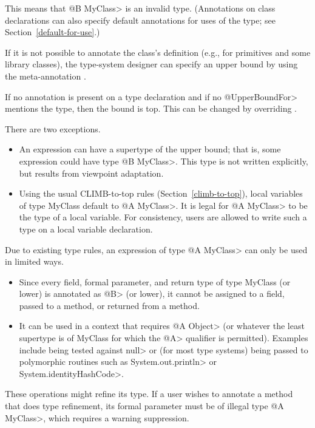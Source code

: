 This means that \<@B MyClass> is an invalid type.  (Annotations on class declarations can also specify
default annotations for uses of the type; see Section~\ref{default-for-use}.)

If it is not possible to annotate the class's definition (e.g., for
primitives and some library classes),
the type-system designer can specify an upper bound by using the meta-annotation
.

If no annotation is present on a type declaration and if no \<@UpperBoundFor> mentions the type, then
the bound is top. This can be changed by overriding
.

There are two exceptions.
\begin{itemize}
  \item
  An expression can have a supertype of the upper bound; that is, some expression could
  have type \<@B MyClass>.  This type is not written explicitly, but results from viewpoint adaptation.
  \item
  Using the usual CLIMB-to-top rules (Section~\ref{climb-to-top}),
  local variables of type MyClass default to \<@A MyClass>.
  It is legal for \<@A MyClass> to be the type of a local variable.
  For consistency, users are allowed to write such a type on a local variable declaration.
\end{itemize}

Due to existing type rules, an expression of type \<@A MyClass> can only be used in limited ways.
\begin{itemize}
  \item
  Since every field, formal parameter, and return type of type MyClass (or lower) is annotated as
  \<@B> (or lower), it cannot be assigned to a field, passed to a method, or returned from a method.
  \item
  It can be used in a context that requires \<@A Object> (or whatever the least supertype is of MyClass
  for which the \<@A> qualifier is permitted).  Examples include being tested against \<null> or
  (for most type systems) being passed to polymorphic routines such as \<System.out.println> or \<System.identityHashCode>.
\end{itemize}

These operations might refine its type.  If a user wishes to annotate a method that does type refinement,
its formal parameter must be of illegal type \<@A MyClass>, which requires a warning suppression.


